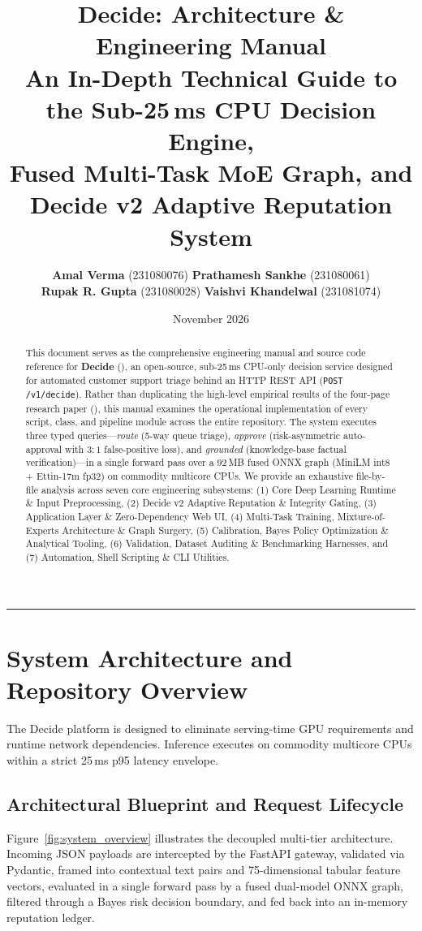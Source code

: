 \documentclass[11pt,a4paper]{article}
\title{\vspace{-1.2cm}\textbf{\huge Decide: Architecture \& Engineering Manual}\\[6pt]
\Large An In-Depth Technical Guide to the Sub-25\,ms CPU Decision Engine,\\Fused Multi-Task MoE Graph, and Decide v2 Adaptive Reputation System}
\author{
  \textbf{Amal Verma} (231080076) \quad
  \textbf{Prathamesh Sankhe} (231080061) \\[4pt]
  \textbf{Rupak R. Gupta} (231080028) \quad
  \textbf{Vaishvi Khandelwal} (231081074)
}
\date{November 2026}
\begin{document}
\maketitle

\begin{abstract}
\noindent
This document serves as the comprehensive engineering manual and source code reference for \textbf{Decide} (), an open-source, sub-25\,ms CPU-only decision service designed for automated customer support triage behind an HTTP REST API (\texttt{POST /v1/decide}). Rather than duplicating the high-level empirical results of the four-page research paper (), this manual examines the operational implementation of every script, class, and pipeline module across the entire repository. The system executes three typed queries---\emph{route} (5-way queue triage), \emph{approve} (risk-asymmetric auto-approval with $3:1$ false-positive loss), and \emph{grounded} (knowledge-base factual verification)---in a single forward pass over a 92\,MB fused ONNX graph (MiniLM int8 + Ettin-17m fp32) on commodity multicore CPUs. We provide an exhaustive file-by-file analysis across seven core engineering subsystems: (1) Core Deep Learning Runtime \& Input Preprocessing, (2) Decide v2 Adaptive Reputation \& Integrity Gating, (3) Application Layer \& Zero-Dependency Web UI, (4) Multi-Task Training, Mixture-of-Experts Architecture \& Graph Surgery, (5) Calibration, Bayes Policy Optimization \& Analytical Tooling, (6) Validation, Dataset Auditing \& Benchmarking Harnesses, and (7) Automation, Shell Scripting \& CLI Utilities.
\end{abstract}

\vspace{0.1cm}
\tableofcontents
\vspace{0.4cm}
\hrule
\vspace{0.4cm}

\section{System Architecture and Repository Overview}

The Decide platform is designed to eliminate serving-time GPU requirements and runtime network dependencies. Inference executes on commodity multicore CPUs within a strict 25\,ms p95 latency envelope.

\subsection{Architectural Blueprint and Request Lifecycle}
Figure~\ref{fig:system_overview} illustrates the decoupled multi-tier architecture. Incoming JSON payloads are intercepted by the FastAPI gateway, validated via Pydantic, framed into contextual text pairs and 75-dimensional tabular feature vectors, evaluated in a single forward pass by a fused dual-model ONNX graph, filtered through a Bayes risk decision boundary, and fed back into an in-memory reputation ledger.
\end{document}
